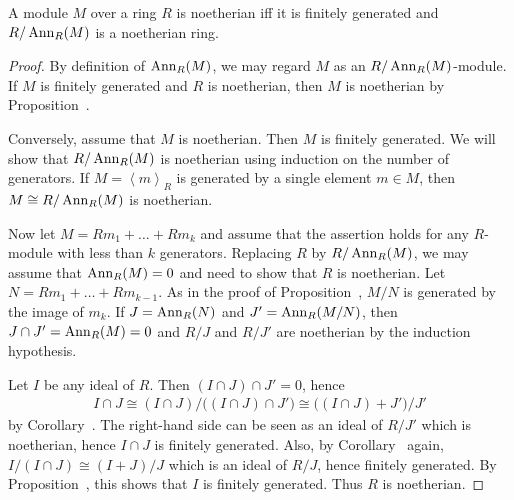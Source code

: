 \documentclass[a4paper,parskip=half,numbers=enddot, DIV=12]{scrreprt}
\begin{document}
	\begin{prop}
		A module $M$ over a ring $R$ is noetherian iff it is finitely generated and $R/\operatorname{Ann}_R(M)$ is a noetherian ring.
	\end{prop}
	\begin{proof}
		By definition of $\operatorname{Ann}_R(M)$, we may regard $M$ as an $R/\operatorname{Ann}_R(M)$-module.	If $M$ is finitely generated and $R$ is noetherian, then $M$ is noetherian by Proposition~. 
		
		Conversely, assume that $M$ is noetherian. Then $M$ is finitely generated. We will show that $R/\operatorname{Ann}_R(M)$ is noetherian using induction on the number of generators. If $M=\left\langle m\right\rangle_R$ is generated by a single element $m\in M$, then $M\cong R/\operatorname{Ann}_R(M)$ is noetherian.
		
		Now let $M=Rm_1+\ldots+Rm_k$ and assume that the assertion holds for any $R$-module with less than $k$ generators. Replacing $R$ by $R/\operatorname{Ann}_R(M)$, we may assume that $\operatorname{Ann}_R(M)=0$ and need to show that $R$ is noetherian. Let $N=Rm_1+\ldots+Rm_{k-1}$. As in the proof of Proposition~, $M/N$ is generated by the image of $m_k$. If $J=\operatorname{Ann}_R(N)$ and $J'=\operatorname{Ann}_R(M/N)$, then $J\cap J'=\operatorname{Ann}_R(M)=0$ and $R/J$ and $R/J'$ are noetherian by the induction hypothesis.
		
		Let $I$ be any ideal of $R$. Then $(I\cap J)\cap J'=0$, hence
		\begin{align*}
			I\cap J\cong (I\cap J)/\big((I\cap J)\cap J'\big)\cong \big((I\cap J)+J'\big)/J'
		\end{align*}
		by Corollary~. The right-hand side can be seen as an ideal of $R/J'$ which is noetherian, hence $I\cap J$ is finitely generated. Also, by Corollary~ again, $I/(I\cap J)\cong (I+J)/J$ which is an ideal of $R/J$, hence finitely generated. By Proposition~, this shows that $I$ is finitely generated. Thus $R$ is noetherian.
	\end{proof}
	
\end{document}

